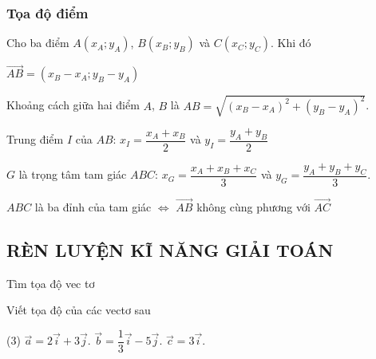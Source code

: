 \subsubsection{Tọa độ điểm}
Cho ba điểm $A\left( x_A;y_A \right)$, $B\left( x_B;y_B\right)$ và $C\left( x_C;y_C\right)$. Khi đó
\begin{tcolorbox}[colframe=cyan,colback=white,boxrule=0.2mm]
	\begin{listEX}[1]
		\item [\ding{172}] $\overrightarrow{AB}=\left( x_B-x_A;y_B-y_A\right)$ 
		\item [\ding{173}] Khoảng cách giữa hai điểm $A$, $B$ là $AB=\sqrt{\left( x_B-x_A\right)^2+\left(y_B-y_A\right)^2}$.
		\item [\ding{174}] Trung điểm $I$ của $AB$:	$x_I=\dfrac{x_A+x_B}{2}$ và $y_I=\dfrac{y_A+y_B}{2}$
		\item [\ding{175}] $G$ là trọng tâm tam giác $ABC$: 
		$x_G=\dfrac{x_A+x_B+x_C}{3}$ và $y_G=\dfrac{y_A+y_B+y_C}{3}$.
		\item [\ding{176}] $ABC$ là ba đỉnh của tam giác $\Leftrightarrow $ $\overrightarrow{AB}$ không cùng phương với $\overrightarrow{AC}$
\end{listEX}
\end{tcolorbox}

\subsection{RÈN LUYỆN KĨ NĂNG GIẢI TOÁN}

\begin{dang}{Tìm tọa độ vec tơ}
	
\end{dang}

\begin{vd}
	Viết tọa độ của các vectơ sau
	\begin{tasks}(3)
		\task $\overrightarrow{a}=2\overrightarrow{i}+3\overrightarrow{j}$.
		\task $\overrightarrow{b}=\dfrac{1}{3}\overrightarrow{i}-5\overrightarrow{j}$.
		\task $\overrightarrow{c}=3\overrightarrow{i}$.
	\end{tasks}
\end{vd}

